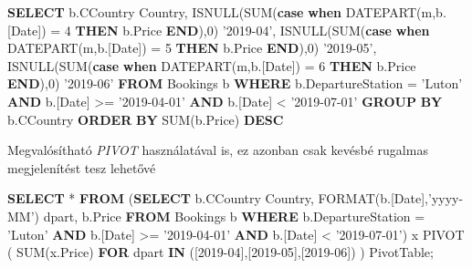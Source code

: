 \documentclass[
]{article}
\newenvironment{Shaded}{\begin{snugshade}}{\end{snugshade}}
\newcommand{\ControlFlowTok}[1]{\textcolor[rgb]{0.00,0.44,0.13}{\textbf{#1}}}
\newcommand{\DataTypeTok}[1]{\textcolor[rgb]{0.56,0.13,0.00}{#1}}
\newcommand{\DecValTok}[1]{\textcolor[rgb]{0.25,0.63,0.44}{#1}}
\newcommand{\FunctionTok}[1]{\textcolor[rgb]{0.02,0.16,0.49}{#1}}
\newcommand{\KeywordTok}[1]{\textcolor[rgb]{0.00,0.44,0.13}{\textbf{#1}}}
\newcommand{\NormalTok}[1]{#1}
\newcommand{\OperatorTok}[1]{\textcolor[rgb]{0.40,0.40,0.40}{#1}}
\newcommand{\StringTok}[1]{\textcolor[rgb]{0.25,0.44,0.63}{#1}}
\begin{document}
\begin{Shaded}
\begin{Highlighting}[]
\KeywordTok{SELECT}\NormalTok{ b.CCountry Country,}
\NormalTok{    ISNULL(}\FunctionTok{SUM}\NormalTok{(}\ControlFlowTok{case} \ControlFlowTok{when}\NormalTok{ DATEPART(m,b.[}\DataTypeTok{Date}\NormalTok{]) }\OperatorTok{=} \DecValTok{4} \ControlFlowTok{THEN}\NormalTok{ b.Price }\ControlFlowTok{END}\NormalTok{),}\DecValTok{0}\NormalTok{) }\StringTok{'2019-04'}\NormalTok{,}
\NormalTok{    ISNULL(}\FunctionTok{SUM}\NormalTok{(}\ControlFlowTok{case} \ControlFlowTok{when}\NormalTok{ DATEPART(m,b.[}\DataTypeTok{Date}\NormalTok{]) }\OperatorTok{=} \DecValTok{5} \ControlFlowTok{THEN}\NormalTok{ b.Price }\ControlFlowTok{END}\NormalTok{),}\DecValTok{0}\NormalTok{) }\StringTok{'2019-05'}\NormalTok{,}
\NormalTok{    ISNULL(}\FunctionTok{SUM}\NormalTok{(}\ControlFlowTok{case} \ControlFlowTok{when}\NormalTok{ DATEPART(m,b.[}\DataTypeTok{Date}\NormalTok{]) }\OperatorTok{=} \DecValTok{6} \ControlFlowTok{THEN}\NormalTok{ b.Price }\ControlFlowTok{END}\NormalTok{),}\DecValTok{0}\NormalTok{) }\StringTok{'2019-06'}
\KeywordTok{FROM}\NormalTok{ Bookings b}
\KeywordTok{WHERE}\NormalTok{ b.DepartureStation }\OperatorTok{=} \StringTok{'Luton'} \KeywordTok{AND}\NormalTok{ b.[}\DataTypeTok{Date}\NormalTok{] }\OperatorTok{>=} \StringTok{'2019-04-01'} \KeywordTok{AND}\NormalTok{ b.[}\DataTypeTok{Date}\NormalTok{] }\OperatorTok{<} \StringTok{'2019-07-01'}
\KeywordTok{GROUP} \KeywordTok{BY}\NormalTok{ b.CCountry}
\KeywordTok{ORDER} \KeywordTok{BY} \FunctionTok{SUM}\NormalTok{(b.Price) }\KeywordTok{DESC}
\end{Highlighting}
\end{Shaded}

Megvalósítható \emph{PIVOT} használatával is, ez azonban csak kevésbé
rugalmas megjelenítést tesz lehetővé

\begin{Shaded}
\begin{Highlighting}[]
\KeywordTok{SELECT} \OperatorTok{*} \KeywordTok{FROM} 
\NormalTok{(}\KeywordTok{SELECT}\NormalTok{ b.CCountry Country, FORMAT(b.[}\DataTypeTok{Date}\NormalTok{],}\StringTok{'yyyy-MM'}\NormalTok{) dpart, b.Price}
    \KeywordTok{FROM}\NormalTok{ Bookings b}
    \KeywordTok{WHERE}\NormalTok{ b.DepartureStation }\OperatorTok{=} \StringTok{'Luton'} \KeywordTok{AND}\NormalTok{ b.[}\DataTypeTok{Date}\NormalTok{] }\OperatorTok{>=} \StringTok{'2019-04-01'} \KeywordTok{AND}\NormalTok{ b.[}\DataTypeTok{Date}\NormalTok{] }\OperatorTok{<} \StringTok{'2019-07-01'}\NormalTok{) x}
\NormalTok{PIVOT (}
\FunctionTok{SUM}\NormalTok{(x.Price)}
\ControlFlowTok{FOR}\NormalTok{ dpart }\KeywordTok{IN}\NormalTok{ ([}\DecValTok{2019}\OperatorTok{-}\DecValTok{04}\NormalTok{],[}\DecValTok{2019}\OperatorTok{-}\DecValTok{05}\NormalTok{],[}\DecValTok{2019}\OperatorTok{-}\DecValTok{06}\NormalTok{])}
\NormalTok{) PivotTable;}
\end{Highlighting}
\end{Shaded}
\end{document}

